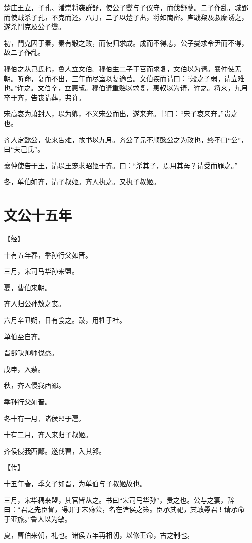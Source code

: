 \documentclass[a4paper,12pt,UTF8,twoside]{ctexbook}
\begin{document}
楚庄王立，子孔、潘崇将袭群舒，使公子燮与子仪守，而伐舒蓼。二子作乱，城郢而使贼杀子孔，不克而还。八月，二子以楚子出，将如商密。庐戢棃及叔麇诱之，遂杀鬥克及公子燮。

初，鬥克囚于秦，秦有殽之败，而使归求成。成而不得志，公子燮求令尹而不得，故二子作乱。

穆伯之从己氏也，鲁人立文伯。穆伯生二子于莒而求复，文伯以为请。襄仲使无朝。听命，复而不出，三年而尽室以复適莒。文伯疾而请曰：“穀之子弱，请立难也。”许之。文伯卒，立惠叔。穆伯请重赂以求复，惠叔以为请，许之。将来，九月卒于齐，告丧请葬，弗许。

宋高哀为萧封人，以为卿，不义宋公而出，遂来奔。书曰：“宋子哀来奔。”贵之也。

齐人定懿公，使来告难，故书以九月。齐公子元不顺懿公之为政也，终不曰“公”，曰“夫己氏”。

襄仲使告于王，请以王宠求昭姬于齐。曰：“杀其子，焉用其母？请受而罪之。”

冬，单伯如齐，请子叔姬。齐人执之。又执子叔姬。


\section{文公十五年}



【经】

十有五年春，季孙行父如晋。

三月，宋司马华孙来盟。

夏，曹伯来朝。

齐人归公孙敖之丧。

六月辛丑朔，日有食之。鼓，用牲于社。

单伯至自齐。

晋郤缺帅师伐蔡。

戊申，入蔡。

秋，齐人侵我西鄙。

季孙行父如晋。

冬十有一月，诸侯盟于扈。

十有二月，齐人来归子叔姬。

齐侯侵我西鄙。遂伐曹，入其郛。

【传】

十五年春，季文子如晋，为单伯与子叔姬故也。

三月，宋华耦来盟，其官皆从之。书曰“宋司马华孙”，贵之也。公与之宴，辞曰：“君之先臣督，得罪于宋殇公，名在诸侯之策。臣承其祀，其敢辱君！请承命于亚旅。”鲁人以为敏。

夏，曹伯来朝，礼也。诸侯五年再相朝，以修王命，古之制也。
\end{document}
